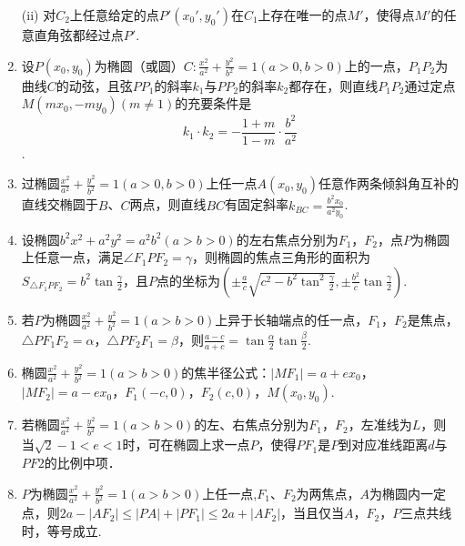 \documentclass{article}
\begin{document}
\begin{enumerate}[label=\arabic*.]
\item[(ii)] 对$C_2$上任意给定的点$P'\left(x_0',y_0'\right)$在$C_1$上存在唯一的点$M'$，使得点$M'$的任意直角弦都经过点$P'$.

\item 设$P\left(x_0, y_0\right)$为椭圆（或圆）$C: \frac{x^2}{a^2} + \frac{y^2}{b^2} = 1\left(a > 0, b > 0\right)$上的一点，$P_1P_2$为曲线$C$的动弦，且弦$PP_1$的斜率$k_1$与$PP_2$的斜率$k_2$都存在，则直线$P_1P_2$通过定点$M\left(mx_0,-my_0\right)\left(m \neq 1\right)$的充要条件是$$k_1 \cdot k_2 = -\frac{1+m}{1-m}\cdot \frac{b^2}{a^2}$$.

\item 过椭圆$\frac{x^2}{a^2} + \frac{y^2}{b^2} = 1\left(a > 0, b > 0\right)$上任一点$A\left(x_0,y_0\right)$任意作两条倾斜角互补的直线交椭圆于$B$、$C$两点，则直线$BC$有固定斜率$k_{BC}=\frac{b^2x_0}{a^2y_0}$. 

\item 设椭圆$b^2x^2+a^2y^2 = a^2b^2\left(a > b > 0\right)$的左右焦点分别为$F_1$，$F_2$，点$P$为椭圆上任意一点，满足$\angle F_1PF_2 = \gamma$，则椭圆的焦点三角形的面积为$S_{\triangle F_1PF_2} = b^2 \tan\frac{\gamma}{2}$，且$P$点的坐标为$\left(\pm \frac{a}{c} \sqrt{c^2-b^2\tan^2\frac{\gamma}{2}},\pm\frac{b^2}{c}\tan\frac{\gamma}{2}\right)$. 

\item 若$P$为椭圆$\frac{x^2}{a^2} + \frac{y^2}{b^2} = 1 \left(a > b > 0\right)$上异于长轴端点的任一点，$F_1$，$F_2$是焦点，$\triangle PF_1F_2 = \alpha$，$\triangle PF_2F_1 = \beta$，则$\frac{a-c}{a+c} = \tan{\frac{\alpha}{2}}\tan{\frac{\beta}{2}}$. 

\item 椭圆$\frac{x^2}{a^2} + \frac{y^2}{b^2} = 1 \left(a > b > 0\right)$的焦半径公式：$\left| MF_1 \right| = a + ex_0$，$\left| MF_2 \right| = a - ex_0$，$F_1\left(-c,0\right)$，$F_2\left(c,0\right)$，$M\left(x_0,y_0\right)$. 

\item 若椭圆$\frac{x^2}{a^2} + \frac{y^2}{b^2} = 1 \left(a > b > 0\right)$的左、右焦点分别为$F_1$，$F_2$，左准线为$L$，则当$\sqrt{2}-1<e<1$时，可在椭圆上求一点$P$，使得$PF_1$是$P$到对应准线距离$d$与$PF2$的比例中项．

\item $P$为椭圆$\frac{x^2}{a^2} + \frac{y^2}{b^2} = 1 \left(a > b > 0\right)$上任一点,$F_1$、$F_2$为两焦点，$A$为椭圆内一定点，则$2a-\left|AF_2 \right| \leq \left| PA \right| + \left| PF_1 \right| \leq 2a + \left| AF_2 \right|$，当且仅当$A$，$F_2$，$P$三点共线时，等号成立. 


\end{enumerate}
\end{document}
